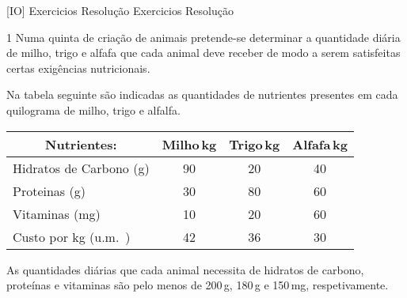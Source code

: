 \documentclass[\mainfilename]{subfiles}
\begin{document}
\graphicspath{{\subfix{./.build/figures/IPEIO-Exercicios_Resolução.2.1/}}}

[IO]
{Exercicios Resolução} %
{Exercicios Resolução} %

\begin{questionBox}1{ %
    Numa quinta de criação de animais pretende-se determinar a quantidade diária de milho, trigo e alfafa que cada animal deve receber de modo a serem satisfeitas certas exigências nutricionais.
} %

    Na tabela seguinte são indicadas as quantidades de nutrientes presentes em cada quilograma de milho, trigo e alfalfa.
    \begin{center}
        \vspace{1ex}
        \begin{tabular}{l *{3}{c}}
            
            \toprule
            
                \multicolumn{1}{c}{Nutrientes:}
                & \multicolumn{1}{c}{Milho\,\unit{\kilo\gram}}
                & \multicolumn{1}{c}{Trigo\,\unit{\kilo\gram}}
                & \multicolumn{1}{c}{Alfafa\,\unit{\kilo\gram}}
            
            \\\midrule
            
                Hidratos de Carbono (\unit{\gram})
                & 90 & 20 & 40
                \\ Proteinas (\unit{\gram})
                & 30 & 80 & 60
                \\ Vitaminas (\unit{\milli\gram})
                & 10 & 20 & 60
            \\\midrule
                Custo por \unit{\kilo\gram} (\unit{u.m.})
                & 42 & 36 & 30
            
            \\\bottomrule
            
        \end{tabular}
        \vspace{0ex}
    \end{center}

    As quantidades diárias que cada animal necessita de hidratos de carbono, proteínas e vitaminas são pelo menos de 200\,\unit{\gram}, 180\,\unit{\gram} e 150\,\unit{\milli\gram}, respetivamente.


\end{questionBox}
\end{document}
